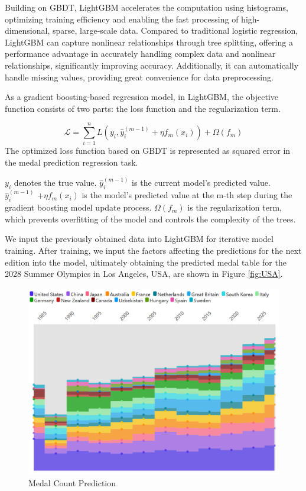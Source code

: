 \documentclass[12pt]{article}  %
\begin{document}
Building on GBDT, LightGBM accelerates the computation using histograms, optimizing training efficiency and enabling the fast processing of high-dimensional, sparse, large-scale data. Compared to traditional logistic regression, LightGBM can capture nonlinear relationships through tree splitting, offering a performance advantage in accurately handling complex data and nonlinear relationships, significantly improving accuracy. Additionally, it can automatically handle missing values, providing great convenience for data preprocessing.

As a gradient boosting-based regression model, in LightGBM, the objective function consists of two parts: the loss function and the regularization term.

\begin{equation}
	\mathcal{L} = \sum_{i=1}^{n} L(y_i, \hat{y}_i^{(m-1)} + \eta f_m(x_i)) + \Omega(f_m)
\end{equation}
The optimized loss function based on GBDT is represented as squared error in the medal prediction regression task.

$y_i$ denotes the true value.
$\hat{y}_i^{(m-1)}$ is the current model's predicted value.
$\hat{y}_i^{(m-1)}$ +$\eta f_m(x_i)$ is the model's predicted value at the m-th step during the gradient boosting model update process.
$\Omega(f_m)$ is the regularization term, which prevents overfitting of the model and controls the complexity of the trees.

We input the previously obtained data into LightGBM for iterative model training. After training, we input the factors affecting the predictions for the next edition into the model, ultimately obtaining the predicted medal table for the 2028 Summer Olympics in Los Angeles, USA, are shown in Figure \ref{fig:USA}.
\begin{figure}[H]
	\centering
	\includegraphics[width=12cm]{img/Predict.png}
	\caption{Medal Count Prediction}
	\label{fig:aa}
\end{figure}
\end{document}
